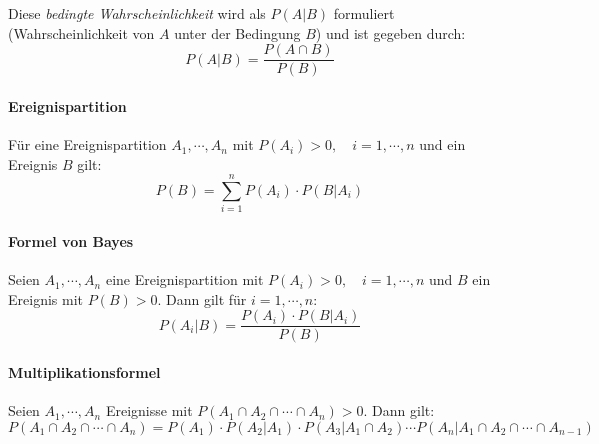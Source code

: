 \documentclass[a4paper, 11pt, accentcolor = tud3b]{tudreport}
\begin{document}
                    Diese \textit{bedingte Wahrscheinlichkeit} wird als \( P(A \vert B) \) formuliert (Wahrscheinlichkeit von \(A\) unter der Bedingung \(B\)) und ist gegeben durch:
                    \begin{equation*}
	                    P(A \vert B) = \frac{P(A \cap B)}{P(B)}
                    \end{equation*}

					\paragraph{Ereignispartition}
						Für eine Ereignispartition \( A_1, \cdots, A_n \) mit \( P(A_i) > 0, \quad i = 1, \cdots, n \) und ein Ereignis \(B\) gilt:
						\begin{equation*}
							P(B) = \sum_{i = 1}^{n} P(A_i) \cdot P(B \vert A_i)
						\end{equation*}

                    \paragraph{Formel von Bayes}
                        Seien \( A_1, \cdots, A_n \) eine Ereignispartition mit \( P(A_i) > 0, \quad i = 1, \cdots, n \) und \(B\) ein Ereignis mit \(P(B) > 0\). Dann gilt für \( i = 1, \cdots, n \):
                        \begin{equation*}
	                        P(A_i \vert B) = \frac{P(A_i) \cdot P(B \vert A_i)}{P(B)}
                        \end{equation*}

                    \paragraph{Multiplikationsformel}
                        Seien \( A_1, \cdots, A_n \) Ereignisse mit \( P(A_1 \cap A_2 \cap \cdots \cap A_n) > 0 \). Dann gilt:
                        \begin{equation*}
	                        P(A_1 \cap A_2 \cap \cdots \cap A_n) = P(A_1) \cdot P(A_2 \vert A_1) \cdot P(A_3 \vert A_1 \cap A_2) \cdots P(A_n \vert A_1 \cap A_2 \cap \cdots \cap A_{n - 1})
                        \end{equation*}
\end{document}
